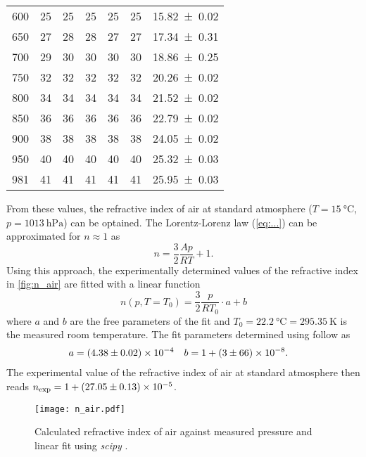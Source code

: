 \begin{table}
\begin{tabular}{c | c c c c c | c}
    {600} & {25} & {25} & {25} & {25} & {25} & \num{15.82+-0.02}\\
    {650} & {27} & {28} & {28} & {27} & {27} & \num{17.34+-0.31}\\
    {700} & {29} & {30} & {30} & {30} & {30} & \num{18.86+-0.25}\\
    {750} & {32} & {32} & {32} & {32} & {32} & \num{20.26+-0.02}\\
    {800} & {34} & {34} & {34} & {34} & {34} & \num{21.52+-0.02}\\
    {850} & {36} & {36} & {36} & {36} & {36} & \num{22.79+-0.02}\\
    {900} & {38} & {38} & {38} & {38} & {38} & \num{24.05+-0.02}\\
    {950} & {40} & {40} & {40} & {40} & {40} & \num{25.32+-0.03}\\
    {981} & {41} & {41} & {41} & {41} & {41} & \num{25.95+-0.03}\\
    \bottomrule
  \end{tabular}
\end{table}
From these values, the refractive index of air at standard atmosphere ($T = \qty{15}{\degreeCelsius}$, $p = \qty{1013}{\hecto\pascal}$) can be optained. The Lorentz-Lorenz law 
(\autoref{eq:...}) can be approximated for $n \approx 1$ as 
\begin{equation*}
  n = \frac{3}{2}\frac{Ap}{RT} + 1.
\end{equation*}
Using this approach, the experimentally determined values of the refractive index in \autoref{fig:n_air} are fitted with a linear function 
\begin{equation*}
  n(p, T = T_0) = \frac{3}{2}\frac{p}{RT_0} \cdot a + b 
\end{equation*}
where $a$ and $b$ are the free parameters of the fit and $T_0 = \qty{22.2}{\degreeCelsius} = \qty{295.35}{\kelvin}$ is the measured room temperature.
The fit parameters determined using  \cite{scipy} follow as 
\begin{align*}
  a &= \num{4.38 +- 0.02e-4} & b &= 1 + \num{3 +- 66e-8}.
\end{align*}
The experimental value of the refractive index of air at standard atmosphere then reads $n_\text{exp} = 1 + \num{27.05+-0.13e-5}$.

\begin{figure}
  \centering
  \texttt{[image: n\_air.pdf]}
  \caption{Calculated refractive index of air against measured pressure and linear fit using \textit{scipy} \cite{scipy}.}
  \label{fig:n_air}
\end{figure}
